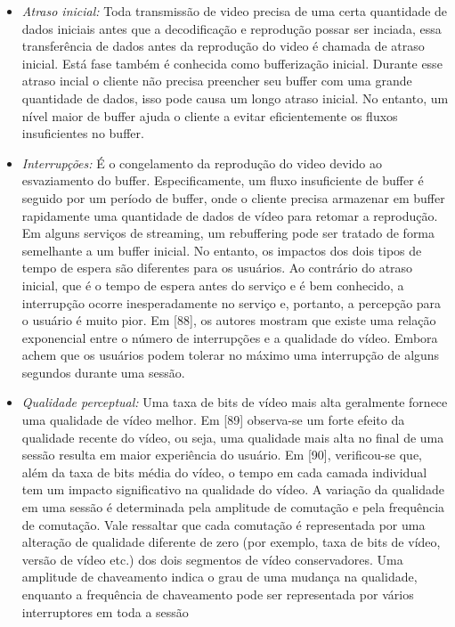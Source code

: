 
\begin{itemize}

\item \textit{Atraso inicial:} Toda transmissão de video precisa de uma certa quantidade de dados iniciais antes que a decodificação e reprodução possar ser inciada, essa transferência de dados antes da reprodução do video é chamada de atraso inicial. Está fase também é conhecida como bufferização inicial. Durante esse atraso incial o cliente não precisa preencher seu buffer com uma grande quantidade de dados, isso pode causa um longo atraso inicial. No entanto, um nível maior de buffer ajuda o cliente a evitar eficientemente os fluxos insuficientes no buffer.

\item \textit{Interrupções:} É o congelamento da reprodução do video devido ao esvaziamento do buffer. Especificamente, um fluxo insuficiente de buffer é seguido por um período de buffer, onde o cliente precisa armazenar em buffer rapidamente uma quantidade de dados de vídeo para retomar a reprodução. 
Em alguns serviços de streaming, um rebuffering pode ser tratado de forma semelhante a um buffer inicial. No entanto, os impactos dos dois tipos de tempo de espera são diferentes para os usuários. Ao contrário do atraso inicial, que é o tempo de espera antes do serviço e é bem conhecido, a interrupção ocorre inesperadamente no serviço e, portanto, a percepção para o usuário é muito pior. Em [88], os autores mostram que existe uma relação exponencial entre o número de interrupções e a qualidade do vídeo. Embora achem que os usuários podem tolerar no máximo uma interrupção de alguns segundos durante uma sessão.

\item \textit{Qualidade perceptual:}
Uma taxa de bits de vídeo mais alta geralmente fornece uma qualidade de vídeo melhor. Em [89] observa-se um forte efeito da qualidade recente do vídeo, ou seja, uma qualidade mais alta no final de uma sessão resulta em maior experiência do usuário.
Em [90], verificou-se que, além da taxa de bits média do vídeo, o tempo em cada camada individual tem um impacto significativo na qualidade do vídeo.
A variação da qualidade em uma sessão é determinada pela amplitude de comutação e pela frequência de comutação. Vale ressaltar que cada comutação é representada por uma alteração de qualidade diferente de zero (por exemplo, taxa de bits de vídeo, versão de vídeo etc.) dos dois segmentos de vídeo conservadores. Uma amplitude de chaveamento indica o grau de uma mudança na qualidade, enquanto a frequência de chaveamento pode ser representada por vários interruptores em toda a sessão


\end{itemize}

